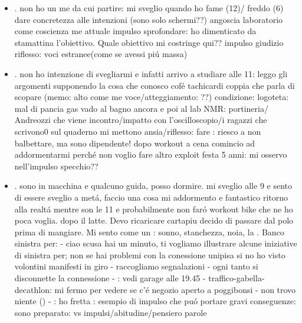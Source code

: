 \begin{itemize}
quando ricordo quello che \'e successo \'e come quando voglio trovare uno stato d'animo o esprimere un concetto: afferrare la nebbia.
\item {}.
non ho un me da cui partire: mi sveglio quando ho fame (12)/ freddo (6)
dare concretezza alle intenzioni (sono solo schermi??)
angoscia laboratorio come coscienza me attuale
impulso sprofondare: ho dimenticato da stamattina l'obiettivo.
Quale obiettivo mi costringe qui??
impulso giudizio riflesso: voci estranee(come se avessi pi\'u massa)
\item {}.
non ho intenzione di svegliarmi e infatti arrivo a studiare alle 11: leggo gli argomenti supponendo la cosa che conosco
cof\'e tachicardi coppia che parla di scopare (memo: alto come me voce/atteggiamento: ??)
condizione: 
logoteta: mal di pancia gas
vado al bagno ancora e poi al lab NMR: portineria/ Andreozzi che viene incontro/impatto con l'oscilloscopio/i ragazzi che scrivono0 sul quaderno mi mettono ansia/riflesso: fare 
: riesco a non balbettare, ma sono dipendente!
dopo workout a cena comincio ad addormentarmi perch\'e non voglio fare altro
exploit festa 5 anni: mi osservo nell'impulso specchio??
\item {}.
sono in macchina e qualcuno guida, posso dormire.
mi sveglio alle 9 e sento di essere sveglio a met\'a, faccio una cosa mi addormento e fantastico ritorno alla realt\'a mentre son le 11 e probabilmente non far\'o workout bike che ne ho poca voglia.  dopo il latte.
Devo ricaricare cartapiu decido di passare dal polo prima di mangiare.
Mi sento come un : sonno, stanchezza, noia, la .
Banco sinistra per:  - ciao scusa hai un minuto, ti vogliamo illustrare alcune iniziative di sinistra per; non se hai problemi con la conessione unipisa si no ho visto volontini manifesti in giro - raccogliamo segnalazioni - ogni tanto si disconnette la connessione - : vedi garage alle 19.45 -
traffico-gabella-decathlon: mi fermo per vedere se c'\'e negozio aperto a poggibonsi - non trovo niente () - : ho fretta : esempio di impulso che pu\'o portare gravi conseguenze: sono preparato:  vs impulsi/abitudine/pensiero parole

\end{itemize}
